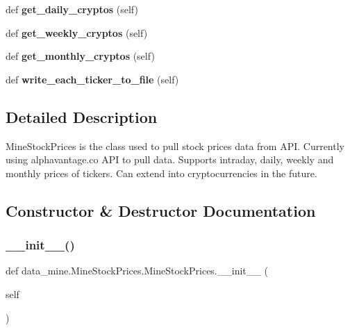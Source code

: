 \begin{DoxyCompactItemize}
def {\bfseries get\+\_\+daily\+\_\+cryptos} (self)
\item 
\mbox{\label{classdata__mine_1_1_mine_stock_prices_1_1_mine_stock_prices_a4c344c50b861530252a3dd75a27696c1}} 
def {\bfseries get\+\_\+weekly\+\_\+cryptos} (self)
\item 
\mbox{\label{classdata__mine_1_1_mine_stock_prices_1_1_mine_stock_prices_ab766380a3f24e5adfe8127fd2a3be6a0}} 
def {\bfseries get\+\_\+monthly\+\_\+cryptos} (self)
\item 
\mbox{\label{classdata__mine_1_1_mine_stock_prices_1_1_mine_stock_prices_a9639ea8ba431172f48d3065455a32193}} 
def {\bfseries write\+\_\+each\+\_\+ticker\+\_\+to\+\_\+file} (self)
\end{DoxyCompactItemize}


\subsection{Detailed Description}
\begin{DoxyVerb}    MineStockPrices is the class used to pull stock prices data from API.
    Currently using alphavantage.co API to pull data.
    Supports intraday, daily, weekly and monthly prices of tickers.
    Can extend into cryptocurrencies in the future.
\end{DoxyVerb}
 

\subsection{Constructor \& Destructor Documentation}
\mbox{\label{classdata__mine_1_1_mine_stock_prices_1_1_mine_stock_prices_a9451b88181645b907f525b9ed63f65b0}} 
\subsubsection{\texorpdfstring{\+\_\+\+\_\+init\+\_\+\+\_\+()}{\_\_init\_\_()}}
{\footnotesize\ttfamily def data\+\_\+mine.\+Mine\+Stock\+Prices.\+Mine\+Stock\+Prices.\+\_\+\+\_\+init\+\_\+\+\_\+ (\begin{DoxyParamCaption}\item[{}]{self }\end{DoxyParamCaption})}

